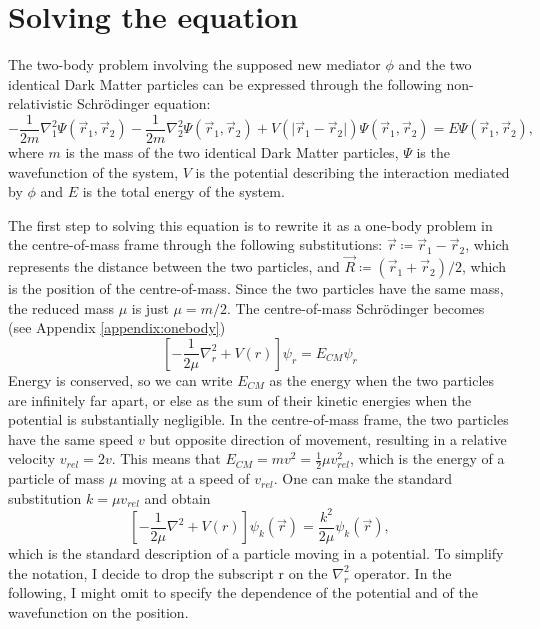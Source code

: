 \chapter{Solving the equation}\label{chap:derivation}
The two-body problem involving the supposed new mediator \(\phi \) and the two identical Dark Matter particles can be expressed through the following non-relativistic Schrödinger equation:
\begin{equation}\label{deriv:initial_equation}
	-\frac{1}{2m} \nabla_1 ^2 \Psi(\vec{r}_1,\vec{r}_2)  - \frac{1}{2m} \nabla_2 ^2 \Psi(\vec{r}_1,\vec{r}_2)  + V(\vert \vec{r}_1 - \vec{r}_2 \vert ) \Psi(\vec{r}_1,\vec{r}_2) =E \Psi (\vec{r}_1,\vec{r}_2),
\end{equation}
where \(m\) is the mass of the two identical Dark Matter particles, \(\Psi\) is the wavefunction of the system, \(V\) is the potential describing the interaction mediated by \(\phi \) and \(E\) is the total energy of the system.

The first step to solving this equation is to rewrite it as a one-body problem in the centre-of-mass frame through the following substitutions: \(\vec{r} \coloneqq  \vec{r}_1 - \vec{r}_2\), which represents the distance between the two particles, and \(\vec{R} \coloneqq (\vec{r}_1 + \vec{r}_2) / 2\), which is the position of the centre-of-mass. Since the two particles have the same mass, the reduced mass \(\mu \) is just \(\mu = m / 2\). The centre-of-mass Schrödinger becomes (see Appendix \ref{appendix:onebody})
\begin{equation}
	\left[- \frac{1}{2\mu }\nabla _r^2 + V(r)\right]\psi _r = E_{CM} \psi _r
\end{equation}
Energy is conserved, so we can write \(E_{CM} \) as the energy when the two particles are infinitely far apart, or else as the sum of their kinetic energies when the potential is substantially negligible. In the centre-of-mass frame, the two particles have the same speed \(v\) but opposite direction of movement, resulting in a relative velocity \(v_{rel} = 2v\). This means that \(E_{CM} = mv^2 = \frac{1}{2} \mu v_{rel}^2\), which is the energy of a particle of mass \(\mu \) moving at a speed of \(v_{rel} \). One can make the standard substitution \(k=\mu v_{rel} \) and obtain
\begin{equation}
	\left[- \frac{1}{2\mu } \nabla ^2 + V(r)\right] \psi _k (\vec{r}) = \frac{k^2}{2\mu } \psi _k (\vec{r}),
\end{equation}
which is the standard description of a particle moving in a potential. To simplify the notation, I decide to drop the subscript r on the \(\nabla _r ^2\) operator. In the following, I might omit to specify the dependence of the potential and of the wavefunction on the position.

